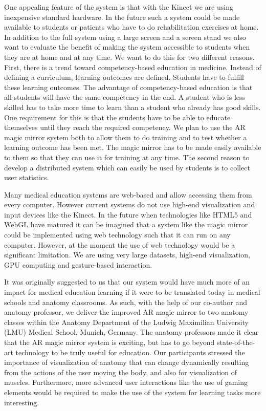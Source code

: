 One appealing feature of the system is that with the Kinect we are using inexpensive standard hardware. In the future such a system could be made available to students or patients who have to do rehabilitation exercises at home. In addition to the full system using a large screen and a screen stand we also want to evaluate the benefit of making the system accessible to students when they are at home and at any time. We want to do this for two different reasons. First, there is a trend toward competency-based education in medicine. Instead of defining a curriculum, learning outcomes are defined. Students have to fulfill these learning outcomes. The advantage of competency-based education is that all students will have the same competency in the end. A student who is less skilled has to take more time to learn than a student who already has good skills. One requirement for this is that the students have to be able to educate themselves until they reach the required competency. We plan to use the AR magic mirror system both to allow them to do training and to test whether a learning outcome has been met. The magic mirror has to be made easily available to them so that they can use it for training at any time. The second reason to develop a distributed system which can easily be used by students is to collect user statistics.

Many medical education systems are web-based and allow accessing them from every computer. However current systems do not use high-end visualization and input devices like the Kinect. In the future when technologies like HTML5 and WebGL have matured it can be imagined that a system like the magic mirror could be implemented using web technology such that it can run on any computer. However, at the moment the use of web technology would be a significant limitation. We are using very large datasets, high-end visualization, GPU computing and gesture-based interaction.

It was originally suggested to us that our system would have much more of an impact for medical education learning if it were to be translated today in medical schools and anatomy classrooms. As such, with the help of our co-author and anatomy professor, we deliver the improved AR magic mirror to two anatomy classes within the Anatomy Department of the Ludwig Maximilian University (LMU) Medical School, Munich, Germany. The anatomy professors made it clear that the AR magic mirror system is exciting, but has to go beyond state-of-the-art technology to be truly useful for education. Our participants stressed the importance of visualization of anatomy that can change dynamically resulting from the actions of the user moving the body, and also for visualization of muscles. Furthermore, more advanced user interactions like the use of gaming elements would be required to make the use of the system for learning tasks more interesting.